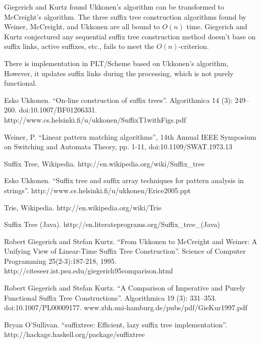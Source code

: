 \documentclass{article}
\begin{document}
Giegerich and Kurtz found Ukkonen's algorithm
can be transformed to McCreight's algorithm\cite{GieKur97}.
The three suffix tree construction algorithms found by
Weiner, McCreight, and Ukkonen are all bound to $O(n)$ time.
Giegerich and Kurtz conjectured any sequential
suffix tree construction method doesn't base on
suffix links, active suffixes, etc., fails to meet the
$O(n)$-criterion.

There is implementation in PLT/Scheme\cite{plt-stree} based on
Ukkonen's algorithm, However, it updates suffix links during the
processing, which is not purely functional.



\begin{thebibliography}{99}

Esko Ukkonen. ``On-line construction of suffix trees''. Algorithmica 14 (3): 249--260. doi:10.1007/BF01206331. http://www.cs.helsinki.fi/u/ukkonen/SuffixT1withFigs.pdf

Weiner, P. ``Linear pattern matching algorithms'', 14th Annual IEEE Symposium on Switching and Automata Theory, pp. 1-11, doi:10.1109/SWAT.1973.13

Suffix Tree, Wikipedia. http://en.wikipedia.org/wiki/Suffix\_tree

Esko Ukkonen. ``Suffix tree and suffix array techniques for pattern analysis in strings''. http://www.cs.helsinki.fi/u/ukkonen/Erice2005.ppt

Trie, Wikipedia. http://en.wikipedia.org/wiki/Trie

Suffix Tree (Java). http://en.literateprograms.org/Suffix\_tree\_(Java)

Robert Giegerich and Stefan Kurtz. ``From Ukkonen to McCreight and Weiner: A Unifying View of Linear-Time Suffix Tree Construction''. Science of Computer Programming 25(2-3):187-218, 1995. http://citeseer.ist.psu.edu/giegerich95comparison.html

Robert Giegerich and Stefan Kurtz. ``A Comparison of Imperative and Purely Functional Suffix Tree Constructions''. Algorithmica 19 (3): 331--353. doi:10.1007/PL00009177. www.zbh.uni-hamburg.de/pubs/pdf/GieKur1997.pdf

Bryan O'Sullivan. ``suffixtree: Efficient, lazy suffix tree implementation''. http://hackage.haskell.org/package/suffixtree


\end{thebibliography}
\end{document}
